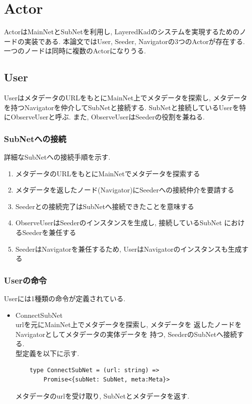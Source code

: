 \documentclass[sotsuron]{jcsie}
\begin{document}
\newpage

\section{Actor}
ActorはMainNetとSubNetを利用し, 
LayeredKadのシステムを実現するためのノードの実装である.
本論文ではUser, Seeder, Navigatorの3つのActorが存在する.
一つのノードは同時に複数のActorになりうる.

\subsection{User}
UserはメタデータのURLをもとにMainNet上でメタデータを探索し, 
メタデータを持つNavigatorを仲介してSubNetと接続する.
SubNetと接続しているUserを特にObserveUserと呼ぶ.
また, ObserveUserはSeederの役割を兼ねる.

\subsubsection{SubNetへの接続}
詳細なSubNetへの接続手順を示す.
\begin{enumerate}
	\item メタデータのURLをもとにMainNetでメタデータを探索する
	\item メタデータを返したノード(Navigator)にSeederへの接続仲介を要請する
	\item Seederとの接続完了はSubNetへ接続できたことを意味する
	\item 
	      ObserveUserはSeederのインスタンスを生成し, 接続しているSubNet
	      におけるSeederを兼任する
	\item SeederはNavigatorを兼任するため, 
		  UserはNavigatorのインスタンスも生成する
\end{enumerate}

\subsubsection{Userの命令}
Userには1種類の命令が定義されている.
\begin{itemize}
	\item {ConnectSubNet}\\
	      urlを元にMainNet上でメタデータを探索し, メタデータを
	      返したノードをNavigatorとしてメタデータの実体データを
	      持つ, SeederのSubNetへ接続する.\\
	      	      	      	      
	      型定義を以下に示す.
	      \begin{lstlisting}
	type ConnectSubNet = (url: string) =>
		Promise<{subNet: SubNet, meta:Meta}>
	      \end{lstlisting}
	      	      	      	      
	      メタデータのurlを受け取り, 
	      SubNetとメタデータを返す.
\end{itemize}
\end{document}
